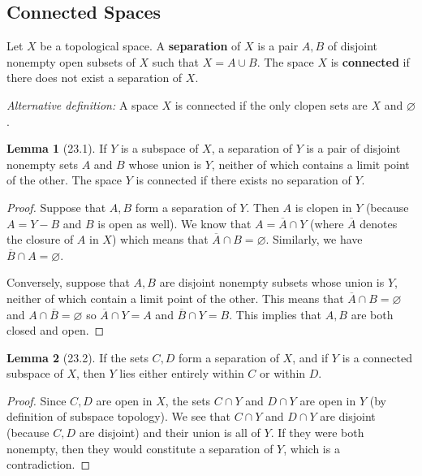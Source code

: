 \documentclass{article}
\newcommand{\nline}{\vspace*{0.5\baselineskip}}
\theoremstyle{definition}
\newtheorem{lemma}{Lemma}[subsection]
\begin{document}
\begin{flushleft}
\subsection{Connected Spaces}

Let $X$ be a topological space. A \textbf{separation} of $X$ is a pair $A, B$ of disjoint nonempty open subsets of $X$ such that $X = A \cup B$. The space $X$ is \textbf{connected} if there does not exist a separation of $X$.

\nline

\textit{Alternative definition:} A space $X$ is connected if the only clopen sets are $X$ and $\varnothing$.

\begin{lemma}[23.1]
If $Y$ is a subspace of $X$, a separation of $Y$ is a pair of disjoint nonempty sets $A$ and $B$ whose union is $Y$, neither of which contains a limit point of the other. The space $Y$ is connected if there exists no separation of $Y$.
\end{lemma}

\begin{proof}
Suppose that $A, B$ form a separation of $Y$. Then $A$ is clopen in $Y$ (because $A = Y - B$ and $B$ is open as well). We know that $A = \overline{A} \cap Y$ (where $\overline{A}$ denotes the closure of $A$ in $X$) which means that $\overline{A} \cap B = \varnothing$. Similarly, we have $\overline{B} \cap A = \varnothing$.

\nline

Conversely, suppose that $A,B$ are disjoint nonempty subsets whose union is $Y$, neither of which contain a limit point of the other. This means that $\overline{A} \cap B = \varnothing$ and $A \cap \overline{B} = \varnothing$ so $\overline{A} \cap Y = A$ and $\overline{B} \cap Y = B$. This implies that $A, B$ are both closed and open.
\end{proof}

\begin{lemma}[23.2]
If the sets $C, D$ form a separation of $X$, and if $Y$ is a connected subspace of $X$, then $Y$ lies either entirely within $C$ or within $D$.
\end{lemma}

\begin{proof}
Since $C,D$ are open in $X$, the sets $C \cap Y$ and $D \cap Y$ are open in $Y$ (by definition of subspace topology). We see that $C \cap Y$ and $D \cap Y$ are disjoint (because $C,D$ are disjoint) and their union is all of $Y$. If they were both nonempty, then they would constitute a separation of $Y$, which is a contradiction.
\end{proof}


\end{flushleft}
\end{document}
